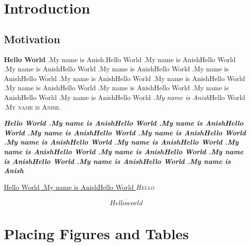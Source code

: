 \documentclass[12pt]{report}
\begin{document}
\tableofcontents
\listoffigures
\listoftables
\chapter{Introduction}
\section{Motivation}
\textbf{Hello World} .My name is Anish.Hello World .My name is AnishHello World .My name is AnishHello World .My name is AnishHello World .My name is AnishHello World .My name is AnishHello World .My name is AnishHello World .My name is AnishHello World .My name is AnishHello World .My name is AnishHello World .My name is AnishHello World .\textit{My name is Anish}Hello World .\textsc{My name is Anish.}

\textbf{\textit{Hello World .My name is AnishHello World .My name is AnishHello World .My name is AnishHello World .My name is AnishHello World .My name is AnishHello World .My name is AnishHello World .My name is AnishHello World .My name is AnishHello World .My name is AnishHello World .My name is AnishHello World .My name is Anish}}

\underline{Hello World .My name is AnishHello World }
\textsc{\textit{Hello}}%

$$\overline{Hello world}$$%

\chapter{Placing Figures and Tables}
\end{document}
